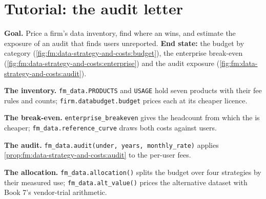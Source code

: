 \begin{omfigure}

\label{fig:fm:data-strategy-and-costs:audit}
\end{omfigure}

\section{Tutorial: the audit letter}\label{tut:fm:data-strategy-and-costs:tut}

\begin{tutorial}
\textbf{Goal.} Price a firm's data inventory, find where an  wins, and estimate the exposure of an audit that finds users
unreported. \textbf{End state:} the budget by category (\cref{fig:fm:data-strategy-and-costs:budget}), the enterprise break-even
(\cref{fig:fm:data-strategy-and-costs:enterprise}) and the audit exposure (\cref{fig:fm:data-strategy-and-costs:audit}).
\begin{tutsteps}
\item \textbf{The inventory.} \texttt{fm\_data.PRODUCTS} and \texttt{USAGE} hold seven products with their fee rules and counts;
\texttt{firm.databudget.budget} prices each at its cheaper licence.
\item \textbf{The break-even.} \texttt{enterprise\_breakeven} gives the headcount from which the  is cheaper;
\texttt{fm\_data.reference\_curve} draws both costs against users.
\item \textbf{The audit.} \texttt{fm\_data.audit(under, years, monthly\_rate)} applies \cref{prop:fm:data-strategy-and-costs:audit} to the
per-user fees.
\item \textbf{The allocation.} \texttt{fm\_data.allocation()} splits the budget over four strategies by their measured use;
\texttt{fm\_data.alt\_value()} prices the alternative dataset with Book 7's vendor-trial arithmetic.
\end{tutsteps}
\end{tutorial}

